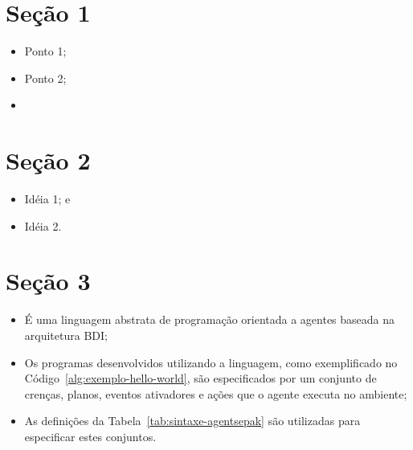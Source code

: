 \documentclass[a0,portrait]{a0poster}
\begin{document}
\begin{multicols}{2}
\color{NavyBlue}
\section*{\huge Seção 1}
\color{Black}
\Large
\justifying

\begin{itemize}
	\item Ponto 1;
	\item Ponto 2;
	\item
\end{itemize}

\color{NavyBlue}
\section*{\huge Seção 2}
\color{Black}

\begin{itemize}
	\item Idéia 1; e
	\item Idéia 2.
\end{itemize}

\color{NavyBlue}
\section*{\huge Seção 3}
\color{Black}

\begin{itemize}
	\item É uma linguagem abstrata de programação orientada a agentes baseada na arquitetura BDI;
	\item Os programas desenvolvidos utilizando a linguagem, como exemplificado no Código~\ref{alg:exemplo-hello-world}, são especificados por um conjunto de crenças, planos, eventos ativadores e ações que o agente executa no ambiente;
	\item As definições da Tabela~\ref{tab:sintaxe-agentsepak} são utilizadas para especificar estes conjuntos.
\end{itemize}


\end{multicols}
\end{document}
